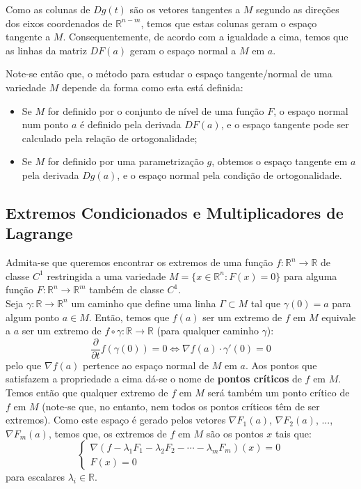 \documentclass{article}
\newcommand{\R}{\mathbb{R}}
\begin{document}
Como as colunas de $Dg(t)$ são os vetores tangentes a $M$ segundo as direções dos eixos coordenados de $\R^{n-m}$, temos que estas colunas geram o espaço tangente a $M$. Consequentemente, de acordo com a igualdade a cima, temos que as linhas da matriz $DF(a)$ geram o espaço normal a $M$ em $a$.

Note-se então que, o método para estudar o espaço tangente/normal de uma variedade $M$ depende da forma como esta está definida:
\begin{itemize}
	\item Se $M$ for definido por o conjunto de nível de uma função $F$, o espaço normal num ponto $a$ é definido pela derivada $DF(a)$, e o espaço tangente pode ser calculado pela relação de ortogonalidade;
	\item Se $M$ for definido por uma parametrização $g$, obtemos o espaço tangente em $a$ pela derivada $Dg(a)$, e o espaço normal pela condição de ortogonalidade.
\end{itemize}

\subsection{Extremos Condicionados e Multiplicadores de Lagrange}
Admita-se que queremos encontrar os extremos de uma função $f: \R^n \to \R$ de classe $C^1$ restringida a uma variedade $M = \{x \in \R^n : F(x) = 0 \}$ para alguma função $F: \R^n \to \R^m$ também de classe $C^1$.\\
Seja $\gamma: \R \to \R^n$ um caminho que define uma linha $\Gamma \subset M$ tal que $\gamma(0) = a$ para algum ponto $a \in M$. Então, temos que $f(a)$ ser um extremo de $f$ em $M$ equivale a $a$ ser um extremo de $f \circ \gamma: \R \to \R$ (para qualquer caminho $\gamma$):
$$ \frac{\partial}{\partial t} f(\gamma(0)) = 0 \Leftrightarrow 
   \nabla f(a) \cdot \gamma'(0) = 0 $$
pelo que $\nabla f(a)$ pertence ao espaço normal de $M$ em $a$. Aos pontos que satisfazem a propriedade a cima dá-se o nome de \textbf{pontos críticos} de $f$ em $M$. Temos então que qualquer extremo de $f$ em $M$ será também um ponto crítico de $f$ em $M$ (note-se que, no entanto, nem todos os pontos críticos têm de ser extremos). Como este espaço é gerado pelos vetores $\nabla F_1(a)$, $\nabla F_2(a)$, ..., $\nabla F_m(a)$, temos que, os extremos de $f$ em $M$ são os pontos $x$ tais que:
$$ \begin{cases}
\nabla \left( f - \lambda_1 F_1 - \lambda_2 F_2 - \cdots - \lambda_m F_m \right) (x) = 0 \\
F(x) = 0
\end{cases} $$
para escalares $\lambda_i \in \R$.
\end{document}
